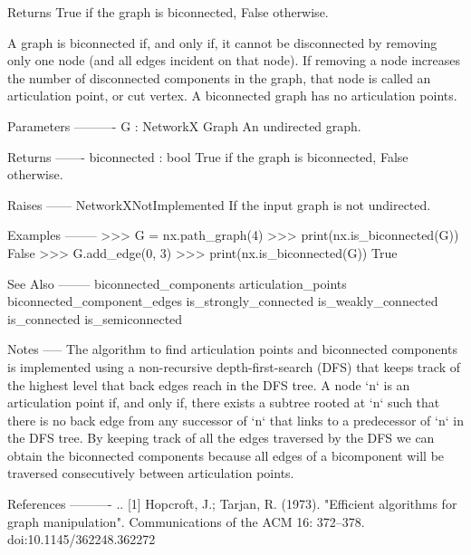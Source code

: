 \begin{DoxyVerb}Returns True if the graph is biconnected, False otherwise.

A graph is biconnected if, and only if, it cannot be disconnected by
removing only one node (and all edges incident on that node).  If
removing a node increases the number of disconnected components
in the graph, that node is called an articulation point, or cut
vertex.  A biconnected graph has no articulation points.

Parameters
----------
G : NetworkX Graph
    An undirected graph.

Returns
-------
biconnected : bool
    True if the graph is biconnected, False otherwise.

Raises
------
NetworkXNotImplemented
    If the input graph is not undirected.

Examples
--------
>>> G = nx.path_graph(4)
>>> print(nx.is_biconnected(G))
False
>>> G.add_edge(0, 3)
>>> print(nx.is_biconnected(G))
True

See Also
--------
biconnected_components
articulation_points
biconnected_component_edges
is_strongly_connected
is_weakly_connected
is_connected
is_semiconnected

Notes
-----
The algorithm to find articulation points and biconnected
components is implemented using a non-recursive depth-first-search
(DFS) that keeps track of the highest level that back edges reach
in the DFS tree.  A node `n` is an articulation point if, and only
if, there exists a subtree rooted at `n` such that there is no
back edge from any successor of `n` that links to a predecessor of
`n` in the DFS tree.  By keeping track of all the edges traversed
by the DFS we can obtain the biconnected components because all
edges of a bicomponent will be traversed consecutively between
articulation points.

References
----------
.. [1] Hopcroft, J.; Tarjan, R. (1973).
   "Efficient algorithms for graph manipulation".
   Communications of the ACM 16: 372–378. doi:10.1145/362248.362272\end{DoxyVerb}
 